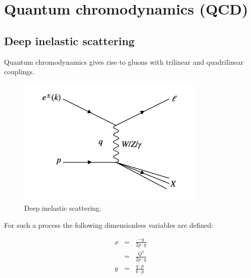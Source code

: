 
\chapter{Quantum chromodynamics (QCD)}

\section{Deep inelastic scattering}

Quantum chromodynamics gives rise to gluons with trilinear and quadrilinear couplings.

\begin{figure}[!htb]
  \begin{center}
    \includegraphics[width=0.8\textwidth]{images/web_feynman/image_60.png}
    \caption[Deep inelastic scattering]{Deep inelastic scattering.}
    \label{fig:ch14_DIS}
  \end{center}
\end{figure}

For such a process the following dimensionless variables are defined:

\begin{eqnarray*}
  x & = & \frac{-q}{2p \cdot q} \\
  & = & \frac{Q^2}{2p \cdot q} \\
  y & = & \frac{q \cdot p}{k \cdot p}
\end{eqnarray*}

